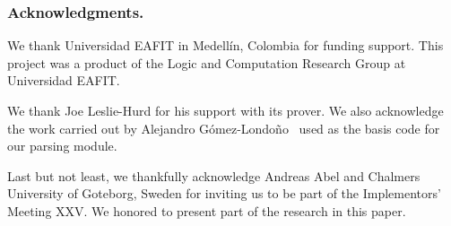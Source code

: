 \documentclass[../main.tex]{subfiles}
\begin{document}

\subsubsection*{Acknowledgments.}

We thank Universidad EAFIT in Medell\'in, Colombia for funding
support. This project was a product of the Logic and Computation
Research Group at Universidad EAFIT.

We thank Joe Leslie-Hurd for his support with its \Metis prover.
We also acknowledge the work carried out by Alejandro G\'omez-Londo\~no~\cite{Gomez-Londono2015} used as the basis code for our \TSTP
parsing module.

Last but not least, we thankfully acknowledge
Andreas Abel and Chalmers University of Goteborg, Sweden for
inviting us to be part of the \Agda Implementors’ Meeting XXV.
We honored to present part of the research in this paper.
\end{document}
